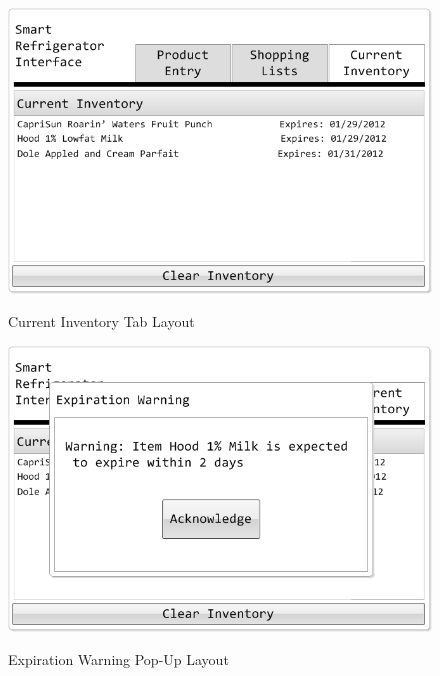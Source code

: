 \documentclass[11pt,letterpaper]{article}
\begin{document}
\begin{figure}[h!]
\begin{center}
\caption{Current Inventory Tab Layout}
\includegraphics[scale=0.5]{MockUp3}
\label{mock3}
\end{center}
\end{figure}

\begin{figure}[h!]
\begin{center}
\caption{Expiration Warning Pop-Up Layout}
\includegraphics[scale=0.5]{MockUp4}
\label{mock4}
\end{center}
\end{figure}

\pagebreak
\end{document}
